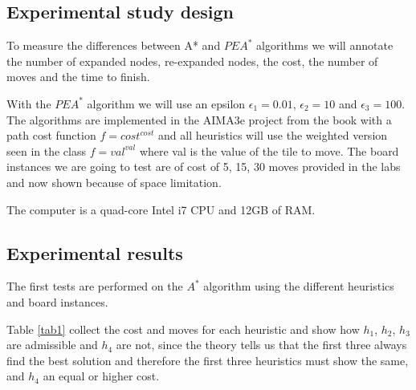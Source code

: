 \documentclass[runningheads]{llncs}
\begin{document}
\subsection{Experimental study design}
To measure the differences between A* and \(PEA^*\) algorithms we will annotate 
the number of expanded nodes, re-expanded nodes, the cost, the number of moves and the time to finish.

With the \(PEA^*\) algorithm we will use an epsilon $\epsilon_1=0.01$, $\epsilon_2=10$ and $\epsilon_3=100$.
The algorithms are implemented in the AIMA3e project from the book \cite{algorithms_2} with a path cost function $f={cost}^{cost}$ and 
all heuristics will use the weighted version seen in the class $f={val}^{val}$ 
where val is the value of the tile to move.
The board instances we are going to test are of cost of 5, 15, 30 moves provided in the labs and now shown because of space limitation.

The computer is a quad-core Intel i7 CPU and 12GB of RAM.
\subsection{Experimental results}
The first tests are performed on the \(A^*\) algorithm using the different heuristics and board instances.

Table \ref{tab1} collect the cost and moves for each heuristic and show how $h_1$, $h_2$, $h_3$ are admissible and $h_4$ are not,
since the theory tells us that the first three always find the best solution and therefore the first three heuristics must show the same, and $h_4$ an equal or higher cost.
\end{document}
